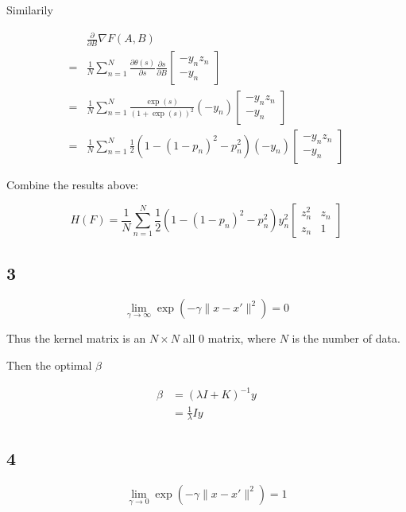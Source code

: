 \documentclass[fleqn,a4paper,12pt]{article}
\begin{document}
Similarily

\begin{align*}
 & \frac{\partial}{\partial B} \nabla F(A, B) \\
=& \frac{1}{N} \sum_{n=1}^{N} \frac{\partial \theta(s)}{\partial s} \frac{\partial s}{\partial B} \begin{bmatrix}-y_n z_n \\ -y_n\end{bmatrix} \\
=& \frac{1}{N} \sum_{n=1}^{N} \frac{\exp(s)}{(1 + \exp(s))^2} (- y_n) \begin{bmatrix}-y_n z_n \\ -y_n\end{bmatrix} \\
=& \frac{1}{N} \sum_{n=1}^{N} \frac{1}{2} (1 - (1 - p_n)^2 - p_n^2) (- y_n) \begin{bmatrix}-y_n z_n \\ -y_n\end{bmatrix}
\end{align*}

Combine the results above:

$$H(F) = \frac{1}{N} \sum_{n=1}^{N} \frac{1}{2} (1 - (1 - p_n)^2 - p_n^2) y_n^2 \begin{bmatrix}z_n^2 & z_n \\ z_n & 1 \end{bmatrix}$$



\subsection*{3}

$$\lim_{\gamma \to \infty} \exp(-\gamma \lVert x - x' \rVert^2) = 0$$

Thus the kernel matrix is an $N \times N$ all $0$ matrix, where $N$ is the number of data.

Then the optimal $\beta$

\begin{align*}
\beta &= (\lambda I + K)^{-1} y \\
      &= \frac{1}{\lambda} I y 
\end{align*}


\subsection*{4}

$$\lim_{\gamma \to 0} \exp(-\gamma \lVert x - x' \rVert^2) = 1$$
\end{document}
